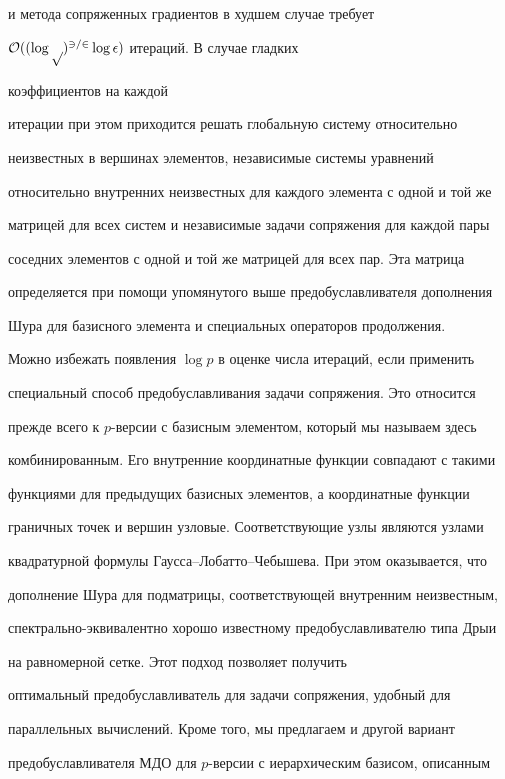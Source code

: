 и метода сопряженных градиентов в худшем случае требует


$\cal O((\log p)^{3/2}\log\epsilon)$ итераций. В случае гладких


коэффициентов на каждой


итерации при этом приходится решать глобальную систему относительно


неизвестных в вершинах элементов, независимые системы уравнений


относительно внутренних неизвестных для каждого элемента с одной и той же


матрицей для всех систем и независимые задачи сопряжения для каждой пары


соседних элементов с одной и той же матрицей для всех пар. Эта матрица


определяется при помощи упомянутого выше предобуславливателя дополнения


Шура для базисного элемента и специальных операторов продолжения.





Можно избежать появления $\log p$ в оценке числа итераций, если применить


специальный способ предобуславливания задачи сопряжения. Это относится


прежде всего к $p$-версии с базисным элементом, который мы называем здесь


комбинированным. Его внутренние координатные функции совпадают с такими


функциями для предыдущих базисных элементов, а координатные функции


граничных точек и вершин узловые. Соответствующие узлы являются узлами


квадратурной формулы Гаусса--Лобатто--Чебышева. При этом оказывается, что


дополнение Шура для подматрицы, соответствующей внутренним неизвестным,


спектрально-эквивалентно хорошо известному предобуславливателю типа Дрыи


\cite{dryja} на равномерной сетке. Этот подход позволяет получить


оптимальный предобуславливатель для задачи сопряжения, удобный для


параллельных вычислений. Кроме того, мы предлагаем и другой вариант


предобуславливателя МДО для $p$-версии с иерархическим базисом, описанным


